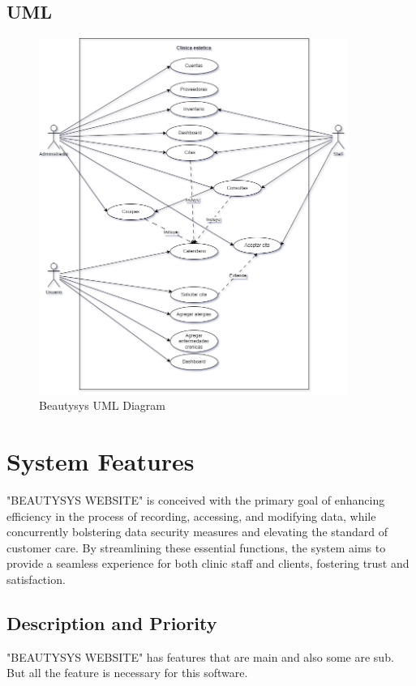 \documentclass{scrreprt}
\begin{document}
\section{UML}

\begin{figure}[H]
    \centering
    \includegraphics[width=0.9\textwidth]{img/UML.png}
    \caption{Beautysys UML Diagram}
\end{figure}

\chapter{System Features}
"BEAUTYSYS WEBSITE" is conceived with the primary goal of enhancing efficiency in the process of recording, accessing, and modifying data, while concurrently bolstering data security measures and elevating the standard of customer care. By streamlining these essential functions, the system aims to provide a seamless experience for both clinic staff and clients, fostering trust and satisfaction.

\section{Description and Priority}
"BEAUTYSYS WEBSITE" has features that are main and also some are sub. But all the feature is necessary for this software.
\end{document}
